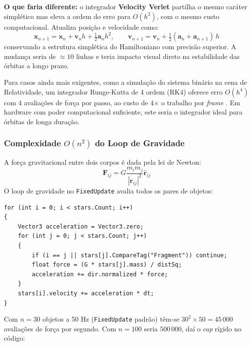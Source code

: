 \documentclass[12pt,a4paper]{article}
\begin{document}
\textbf{O que faria diferente:} o integrador \textbf{Velocity Verlet} partilha o mesmo car\'{a}ter simpl\'{e}tico mas eleva a ordem do erro para $O(h^2)$, com o mesmo custo computacional. Atualiza posi\c{c}\~{a}o e velocidade como:
\begin{equation}
\mathbf{x}_{n+1} = \mathbf{x}_n + \mathbf{v}_n h + \tfrac{1}{2}\mathbf{a}_n h^2, \qquad
\mathbf{v}_{n+1} = \mathbf{v}_n + \tfrac{1}{2}(\mathbf{a}_n + \mathbf{a}_{n+1})\, h
\end{equation}
conservando a estrutura simpl\'{e}tica do Hamiltoniano \cite{wisdom1991,hockney1981} com precis\~{a}o superior. A mudan\c{c}a seria de $\approx 10$ linhas e teria impacto visual direto na estabilidade das \'{o}rbitas a longo prazo.

Para casos ainda mais exigentes, como a simula\c{c}\~{a}o do sistema bin\'{a}rio na cena de Relatividade, um integrador Runge-Kutta de 4\textordfeminine{} ordem (RK4) oferece erro $O(h^4)$ com 4 avalia\c{c}\~{o}es de for\c{c}a por passo, ao custo de 4$\times$ o trabalho por \textit{frame} \cite{hairer1993,varintegrators2006}. Em hardware com poder computacional suficiente, este seria o integrador ideal para \'{o}rbitas de longa dura\c{c}\~{a}o.

\subsubsection{Complexidade $O(n^2)$ do Loop de Gravidade}

A for\c{c}a gravitacional entre dois corpos \'{e} dada pela lei de Newton:
\begin{equation}
\mathbf{F}_{ij} = G \frac{m_i m_j}{|\mathbf{r}_{ij}|^2} \hat{\mathbf{r}}_{ij}
\end{equation}
O loop de gravidade no \texttt{FixedUpdate} avalia todos os pares de objetos:

\begin{lstlisting}[caption={StarSystemManager.cs - loop N-body O(n$^2$)}]
for (int i = 0; i < stars.Count; i++)
{
    Vector3 acceleration = Vector3.zero;
    for (int j = 0; j < stars.Count; j++)
    {
        if (i == j || stars[j].CompareTag("Fragment")) continue;
        float force = (G * stars[j].mass) / distSq;
        acceleration += dir.normalized * force;
    }
    stars[i].velocity += acceleration * dt;
}
\end{lstlisting}

Com $n = 30$ objetos a 50 Hz (\texttt{FixedUpdate} padr\~{a}o) t\^{e}m-se $30^2 \times 50 = 45\,000$ avalia\c{c}\~{o}es de for\c{c}a por segundo. Com $n = 100$ seria $500\,000$, da\'{i} o \textit{cap} r\'{i}gido no c\'{o}digo:
\end{document}
